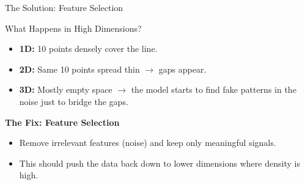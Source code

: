 \begin{frame}{The Solution: Feature Selection}

    \begin{block}{What Happens in High Dimensions?}
        \begin{itemize}
            \item[\textcolor{blue!70}{$\rightarrow$}] \textbf{1D:} 10 points densely cover the line.
            \item[\textcolor{orange!70}{$\rightarrow$}] \textbf{2D:} Same 10 points spread thin $\rightarrow$ gaps appear.
            \item[\textcolor{red!70}{$\rightarrow$}] \textbf{3D:} Mostly empty space $\rightarrow$ the model starts to find fake patterns in the noise just to bridge the gaps.
        \end{itemize}
    \end{block}

    \vspace{2em}
    
    \begin{tcolorbox}[colback=green!5, colframe=green!50, arc=3pt, boxrule=1pt]
        \centering
        \large \textbf{The Fix: Feature Selection}
        \vspace{0.5em}
        \normalsize
        \begin{itemize}
            \item Remove irrelevant features (noise) and keep only meaningful signals.
            \item This should push the data back down to lower dimensions where density is high.
        \end{itemize}
    \end{tcolorbox}

\end{frame}


